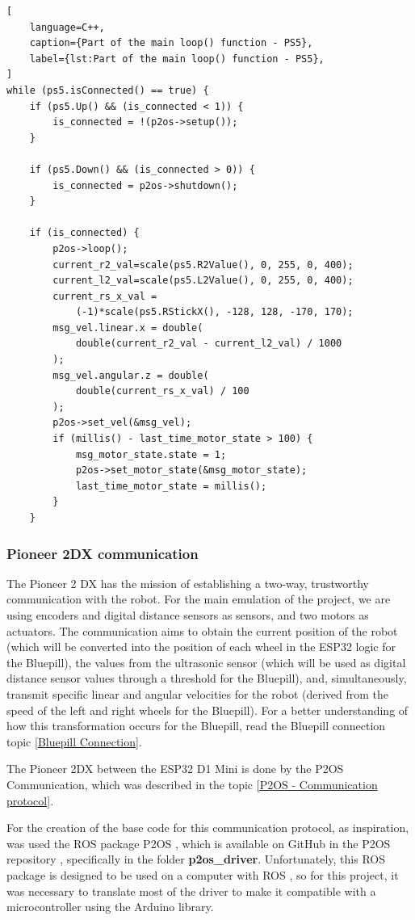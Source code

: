 \documentclass[../../monografia.tex]{subfiles}
\begin{document}
\begin{lstlisting}[
    language=C++,
    caption={Part of the main loop() function - PS5},
    label={lst:Part of the main loop() function - PS5},
]
while (ps5.isConnected() == true) {
    if (ps5.Up() && (is_connected < 1)) {
        is_connected = !(p2os->setup());
    }

    if (ps5.Down() && (is_connected > 0)) {
        is_connected = p2os->shutdown();
    }

    if (is_connected) {
        p2os->loop();
        current_r2_val=scale(ps5.R2Value(), 0, 255, 0, 400);  
        current_l2_val=scale(ps5.L2Value(), 0, 255, 0, 400);
        current_rs_x_val =
            (-1)*scale(ps5.RStickX(), -128, 128, -170, 170);  
        msg_vel.linear.x = double(
            double(current_r2_val - current_l2_val) / 1000
        );
        msg_vel.angular.z = double(
            double(current_rs_x_val) / 100
        );
        p2os->set_vel(&msg_vel);
        if (millis() - last_time_motor_state > 100) {
            msg_motor_state.state = 1;
            p2os->set_motor_state(&msg_motor_state);
            last_time_motor_state = millis();
        }
    }
\end{lstlisting}

\subsubsection{Pioneer 2DX communication}

The Pioneer 2 DX has the mission of establishing a two-way, trustworthy communication with the robot. For the main emulation of the project, we are using encoders and digital distance sensors as sensors, and two motors as actuators. The communication aims to obtain the current position of the robot (which will be converted into the position of each wheel in the ESP32 logic for the Bluepill), the values from the ultrasonic sensor (which will be used as digital distance sensor values through a threshold for the Bluepill), and, simultaneously, transmit specific linear and angular velocities for the robot (derived from the speed of the left and right wheels for the Bluepill). For a better understanding of how this transformation occurs for the Bluepill, read the Bluepill connection topic \ref{Bluepill Connection}.

The Pioneer 2DX between the ESP32 D1 Mini is done by the P2OS Communication, which was described in the topic \ref{P2OS - Communication protocol}.

For the creation of the base code for this communication protocol, as inspiration, was used the ROS package P2OS \cite{p2os_ros_24}, which is available on GitHub in the P2OS repository \cite{p2os_github_24}, specifically in the folder \textbf{p2os\_driver}. Unfortunately, this ROS package is designed to be used on a computer with ROS \cite{ROS_website_24}, so for this project, it was necessary to translate most of the driver to make it compatible with a microcontroller using the Arduino library.
\end{document}
